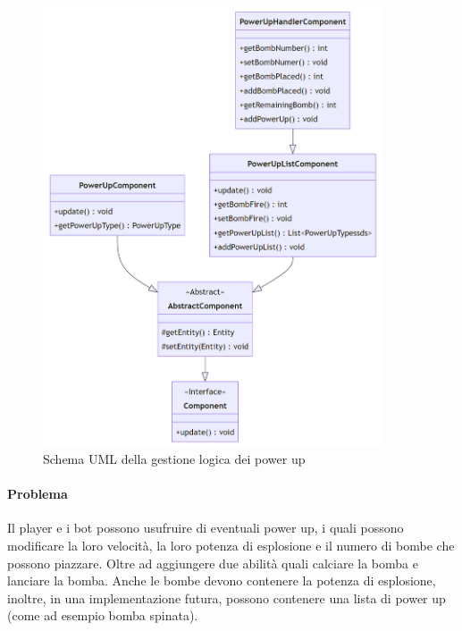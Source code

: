 \documentclass[a4paper,12pt]{report}
\begin{document}
\begin{figure}[H]
    \centering{}
    \includegraphics[width=0.90\textwidth]{img/UMLPowerUp.png}
    \caption{Schema UML della gestione logica dei power up}
\end{figure}

\paragraph{Problema} Il player e i bot possono usufruire di eventuali power up, i quali possono modificare la loro velocità, la loro potenza di esplosione e il numero di bombe che possono piazzare. Oltre ad aggiungere due abilità quali calciare la bomba e lanciare la bomba. Anche le bombe devono contenere la potenza di esplosione, inoltre, in una implementazione futura, possono contenere una lista di power up (come ad esempio bomba spinata).
\end{document}
